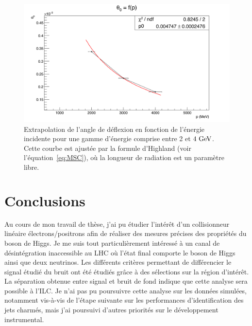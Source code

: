    \begin{figure}[!h]
     \centering
     \includegraphics[width = \textwidth]{Pictures/X0/theta0VsP_2-4GeV.png}
     \caption{Extrapolation de l'angle de déflexion en fonction de l'énergie incidente pour une gamme d'énergie comprise entre 2 et $4~\rm{GeV}$.
     Cette courbe est ajustée par la formule d'Highland (voir l'équation~\ref{eq:MSC}), où la longueur de radiation est un paramètre libre.}
     \label{fig:theta0_2-4}
   \end{figure}

  \section{Conclusions}
 
  Au cours de mon travail de thèse, j'ai pu étudier l'intérêt d'un collisionneur linéaire électrons/positrons afin de réaliser des mesures précises des propriétés du boson de Higgs.
  Je me suis tout particulièrement intéressé à un canal de désintégration inaccessible au LHC où l'état final comporte le boson de Higgs ainsi que deux neutrinos. 
  Les différents critères permettant de différencier le signal étudié du bruit ont été étudiés grâce à des sélections sur la région d'intérêt.
  La séparation obtenue entre signal et bruit de fond indique que cette analyse sera possible à l'ILC.
  Je n'ai pas pu poursuivre cette analyse sur les données simulées, notamment vis-à-vis de l'étape suivante sur les performances d'identification des jets charmés, mais j'ai poursuivi d'autres priorités sur le développement instrumental.

